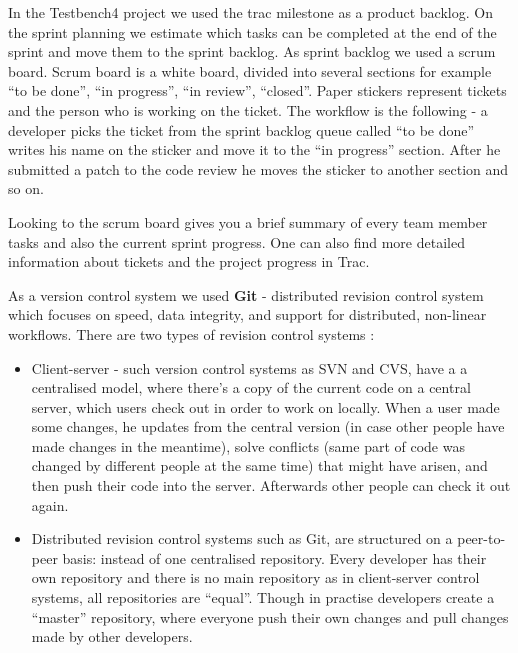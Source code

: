 \documentclass{article}
\begin{document}
  In the Testbench4 project we used the trac milestone as a product backlog. On
  the sprint planning we estimate which tasks can be completed at the end of the sprint 
  and move them to the sprint backlog. As sprint backlog we used a scrum board.
  Scrum board is a white board, divided into several sections for example “to be done”, “in progress”, “in review”,
  “closed”. Paper stickers represent tickets and the person who is working on
  the ticket. The workflow is the following - a developer picks the
  ticket from the sprint backlog queue called “to be done” 
  writes his name on the sticker and move it to the “in progress” section.
  After he submitted a patch to the code review he moves the sticker to another
  section and so on.
  
  Looking to the scrum board gives you a brief summary of every team member tasks and 
  also the current sprint progress. One can also find more detailed information
  about tickets and the project progress in Trac.
 
  
  As a version control system we used \textbf{Git} - distributed revision control system
  which focuses on speed, data integrity, and support for distributed,
  non-linear workflows. There are two types of revision control systems :
  
   \begin{itemize}
   \item Client-server - such version control systems as SVN and CVS, have a 
    a centralised model, where there's a copy of the current code on a central
    server, which users check out in order to work on locally. When a user made
    some changes, he updates from the central version (in case other people have
    made changes in the meantime), solve conflicts (same part of code was
    changed by different people at the same time) that might have arisen, and
    then push their code into the server. Afterwards other people can check it out again.

   \item Distributed revision control systems such as Git, are structured on a
    peer-to-peer basis: instead of one centralised repository. Every developer
    has their own repository and there is no main repository as in client-server
    control systems, all repositories are “equal”. Though in practise developers
    create a “master” repository, where everyone push their own changes and pull
    changes made by other developers.
  \end{itemize}
  
\end{document}
